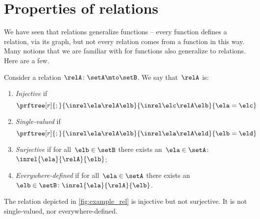
\section{Properties of relations}

We have seen that relations generalize functions -- every function defines a relation, via its graph, but not every relation comes from a function in this way.
Many notions that we are familiar with for functions also generalize to relations.
Here are a few.

\begin{ctdefinition}
    \label{def:rel_properties}
    Consider a relation $\relA \colon \setA \mto \setB$.
    We say that~$\relA$ is:
    \begin{enumerate}
        \item \emph{Injective} if
              \begin{equation}
                  \prftree[r]{;}{
                      \inrel \ela \relA \elb
                  }{
                      \inrel \elc \relA \elb
                  }{
                      \ela=\elc
                  }
              \end{equation}
        \item \emph{Single-valued} if
              \begin{equation}
                  \prftree[r]{;}{
                      \inrel \ela \relA \elb
                  }{
                      \inrel \ela \relA \eld
                  }{
                      \elb = \eld
                  }
              \end{equation}
        \item \emph{Surjective} if for all~$\elb\in \setB$ there exists an~$\ela\in \setA$:~$\inrel{\ela}{\relA}{\elb}$;
        \item \emph{Everywhere-defined} if for all~$\ela\in \setA$ there exists an ~$\elb \in \setB\colon \inrel{\ela}{\relA}{\elb}$.
    \end{enumerate}
\end{ctdefinition}

\begin{example}
    The relation depicted in \cref{fig:example_rel} is injective but not surjective.
    It is not single-valued, nor everywhere-defined.
\end{example}

